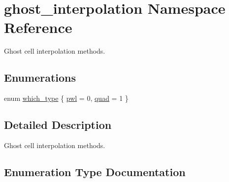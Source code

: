 \hypertarget{namespaceghost__interpolation}{}\section{ghost\+\_\+interpolation Namespace Reference}
\label{namespaceghost__interpolation}


Ghost cell interpolation methods.  


\subsection*{Enumerations}
\begin{DoxyCompactItemize}
\item 
enum \hyperlink{namespaceghost__interpolation_a2e226123d3c841dd1034c7e62db3468c}{which\+\_\+type} \{ \hyperlink{namespaceghost__interpolation_a2e226123d3c841dd1034c7e62db3468ca2b27f77c82388ff9c7dc23de43d414bf}{pwl} = 0, 
\hyperlink{namespaceghost__interpolation_a2e226123d3c841dd1034c7e62db3468ca81af9e2217815e188e38e4c6e39a1d55}{quad} = 1
 \}
\end{DoxyCompactItemize}


\subsection{Detailed Description}
Ghost cell interpolation methods. 

\subsection{Enumeration Type Documentation}
